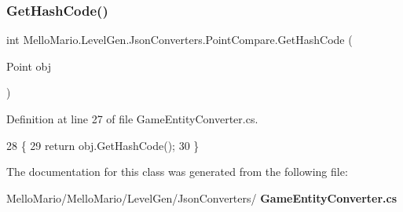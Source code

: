 \subsubsection{Get\+Hash\+Code()}
{\footnotesize\ttfamily int Mello\+Mario.\+Level\+Gen.\+Json\+Converters.\+Point\+Compare.\+Get\+Hash\+Code (\begin{DoxyParamCaption}\item[{Point}]{obj }\end{DoxyParamCaption})}



Definition at line 27 of file Game\+Entity\+Converter.\+cs.


\begin{DoxyCode}
28         \{
29             \textcolor{keywordflow}{return} obj.GetHashCode();
30         \}
\end{DoxyCode}


The documentation for this class was generated from the following file\+:\begin{DoxyCompactItemize}
\item 
Mello\+Mario/\+Mello\+Mario/\+Level\+Gen/\+Json\+Converters/\textbf{ Game\+Entity\+Converter.\+cs}\end{DoxyCompactItemize}
